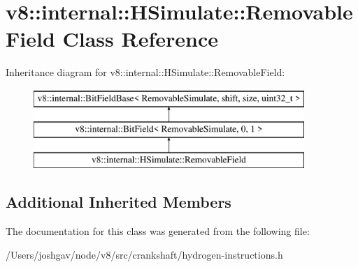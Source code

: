 \hypertarget{classv8_1_1internal_1_1_h_simulate_1_1_removable_field}{}\section{v8\+:\+:internal\+:\+:H\+Simulate\+:\+:Removable\+Field Class Reference}
\label{classv8_1_1internal_1_1_h_simulate_1_1_removable_field}
Inheritance diagram for v8\+:\+:internal\+:\+:H\+Simulate\+:\+:Removable\+Field\+:\begin{figure}[H]
\begin{center}
\leavevmode
\includegraphics[height=3.000000cm]{classv8_1_1internal_1_1_h_simulate_1_1_removable_field}
\end{center}
\end{figure}
\subsection*{Additional Inherited Members}


The documentation for this class was generated from the following file\+:\begin{DoxyCompactItemize}
\item 
/\+Users/joshgav/node/v8/src/crankshaft/hydrogen-\/instructions.\+h\end{DoxyCompactItemize}
